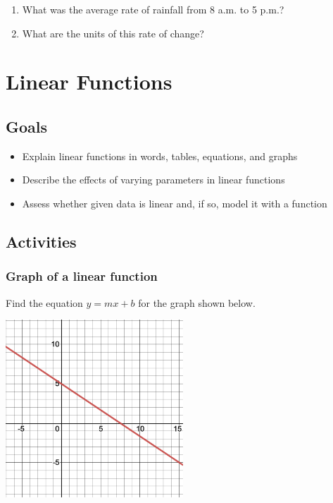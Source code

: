 \documentclass[
]{book}
\providecommand{\tightlist}{%
  \setlength{\itemsep}{0pt}\setlength{\parskip}{0pt}}
\begin{document}
\begin{enumerate}
\def\labelenumi{\arabic{enumi}.}
\tightlist
\item
  What was the average rate of rainfall from 8 a.m. to 5 p.m.?
\item
  What are the units of this rate of change?
\end{enumerate}

\hypertarget{linear-functions}{%
\chapter{Linear Functions}\label{linear-functions}}

\hypertarget{goals-1}{%
\section{Goals}\label{goals-1}}

\begin{itemize}
\tightlist
\item
  Explain linear functions in words, tables, equations, and graphs
\item
  Describe the effects of varying parameters in linear functions
\item
  Assess whether given data is linear and, if so, model it with a function
\end{itemize}

\hypertarget{activities-1}{%
\section{Activities}\label{activities-1}}

\hypertarget{graph-of-a-linear-function}{%
\subsection{Graph of a linear function}\label{graph-of-a-linear-function}}

Find the equation \(y=mx+b\) for the graph shown below.

\includegraphics[width=0.5\textwidth,height=\textheight]{images/linear-graph.png}
\end{document}
